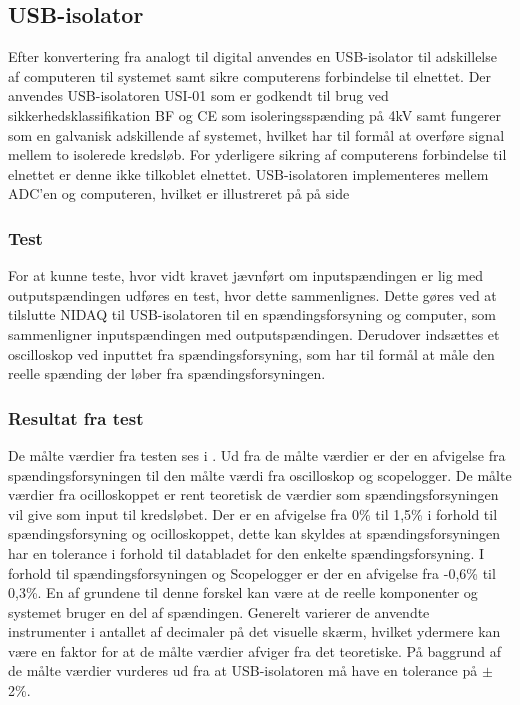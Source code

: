 \subsection{USB-isolator}
Efter konvertering fra analogt til digital anvendes en USB-isolator til adskillelse af computeren til systemet samt sikre computerens forbindelse til elnettet. 
Der anvendes USB-isolatoren USI-01 som er godkendt til brug ved sikkerhedsklassifikation BF og CE som isoleringsspænding på 4kV samt fungerer som en galvanisk adskillende af systemet, hvilket har til formål at overføre signal mellem to isolerede kredsløb. For yderligere sikring af computerens forbindelse til elnettet er denne ikke tilkoblet elnettet. USB-isolatoren implementeres mellem ADC'en og computeren, hvilket er illustreret på  på side \pageref{blokdiagram}

\subsubsection{Test}
For at kunne teste, hvor vidt kravet jævnført \pageref{kravspecifikationer} om inputspændingen er lig med outputspændingen udføres en test, hvor dette sammenlignes. Dette gøres ved at tilslutte NIDAQ til USB-isolatoren til en spændingsforsyning og computer, som sammenligner inputspændingen med outputspændingen. Derudover indsættes et oscilloskop ved inputtet fra spændingsforsyning, som har til formål at måle den reelle spænding der løber fra spændingsforsyningen. 

\subsubsection{Resultat fra test}
De målte værdier fra testen ses i . Ud fra de målte værdier er der en afvigelse fra spændingsforsyningen til den målte værdi fra oscilloskop og scopelogger. De målte værdier fra ocilloskoppet er rent teoretisk de værdier som spændingsforsyningen vil give som input til kredsløbet. Der er en afvigelse fra 0\% til 1,5\% i forhold til spændingsforsyning og ocilloskoppet, dette kan skyldes at spændingsforsyningen har en tolerance i forhold til databladet for den enkelte spændingsforsyning. I forhold til spændingsforsyningen og Scopelogger er der en afvigelse fra -0,6\% til 0,3\%. En af grundene til denne forskel kan være at de reelle komponenter og systemet bruger en del af spændingen. Generelt varierer de anvendte instrumenter i antallet af decimaler på det visuelle skærm, hvilket ydermere kan være en faktor for at de målte værdier afviger fra det teoretiske. På baggrund af de målte værdier vurderes ud fra \pageref{kravspecifikationer} at USB-isolatoren må have en tolerance på $\pm$ 2\%.

